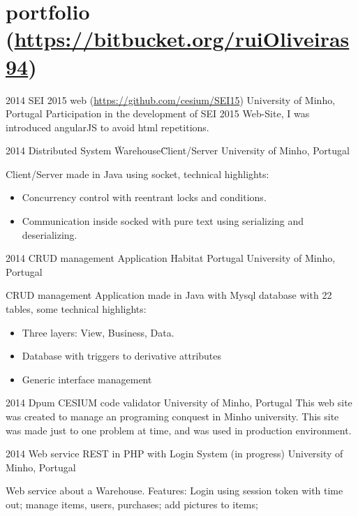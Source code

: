\documentclass[]{friggeri-cv} %
\begin{document}
\section{portfolio {\normalfont \normalsize (\href{https://bitbucket.org/ruiOliveiras94}{https://bitbucket.org/ruiOliveiras94})}}
\begin{entrylist}

\entry
{2014}
{SEI 2015 web  {\normalfont \normalsize (\href{https://github.com/cesium/SEI15}{https://github.com/cesium/SEI15})}}
{University of Minho, Portugal}
{Participation in the development of SEI 2015 Web-Site, I was introduced angularJS to avoid html repetitions.}

\entry
{2014}
{Distributed System \"Warehouse\" Client/Server }
{University of Minho, Portugal}
{Client/Server made in Java using socket, technical highlights:
\begin{itemize} 
    \item Concurrency control with reentrant locks and conditions.
    \item Communication inside socked with pure text using serializing and deserializing.
\end{itemize}
}
\entry
{2014}
{CRUD management Application Habitat Portugal}
{University of Minho, Portugal}
{CRUD management Application made in Java with Mysql database with 22 tables, some technical highlights:
\begin{itemize} 
    \item Three layers: View, Business, Data.
    \item Database with triggers to derivative attributes
    \item Generic interface management
\end{itemize}
}
\entry
{2014}
{Dpum CESIUM code validator}
{University of Minho, Portugal}
{This web site was created to manage an programing conquest in Minho university.
 This site was made just to one problem at time, and was used in production environment.}


\entry
{2014}
{Web service REST in PHP with Login System {\normalfont(in progress)}}
{University of Minho, Portugal}
{Web service about a Warehouse. Features: Login using session token with time out; manage items, users, purchases; add pictures to items;

}


\end{entrylist}
\end{document}
